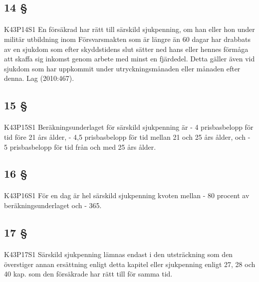 \documentclass[a4paper,notitlepage,openany,10pt]{book}
\begin{document}
\subsection*{14 §}
\paragraph*{}
{\tiny K43P14S1}
En försäkrad har rätt till särskild sjukpenning, om han eller hon under militär utbildning inom Försvarsmakten som är längre än 60 dagar har drabbats av en sjukdom som efter skyddstidens slut sätter ned hans eller hennes förmåga att skaffa sig inkomst genom arbete med minst en fjärdedel. Detta gäller även vid sjukdom som har uppkommit under utryckningsmånaden eller månaden efter denna.
Lag (2010:467).
\subsection*{15 §}
\paragraph*{}
{\tiny K43P15S1}
Beräkningsunderlaget för särskild sjukpenning är
\newline - 4 prisbasbelopp för tid före 21 års ålder,
\newline - 4,5 prisbasbelopp för tid mellan 21 och 25 års ålder, och
\newline - 5 prisbasbelopp för tid från och med 25 års ålder.
\subsection*{16 §}
\paragraph*{}
{\tiny K43P16S1}
För en dag är hel särskild sjukpenning kvoten mellan
\newline - 80 procent av beräkningsunderlaget och
\newline - 365.
\subsection*{17 §}
\paragraph*{}
{\tiny K43P17S1}
Särskild sjukpenning lämnas endast i den utsträckning som den överstiger annan ersättning enligt detta kapitel eller sjukpenning enligt 27, 28 och 40 kap. som den försäkrade har rätt till för samma tid.
\end{document}
